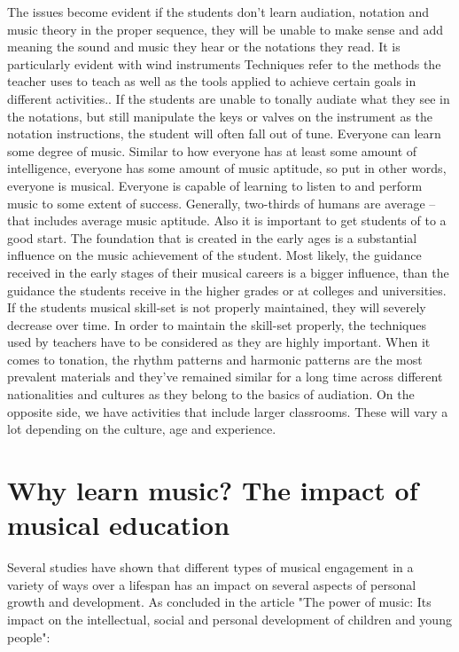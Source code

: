 The issues become evident if the students don’t learn audiation, notation and music theory in the proper sequence, they will be unable to make sense and add meaning the sound and music they hear or the notations they read. It is particularly evident with wind instruments Techniques refer to the methods the teacher uses to teach as well as the tools applied to achieve certain goals in different activities.. If the students are unable to tonally audiate what they see in the notations, but still manipulate the keys or valves on the instrument as the notation instructions, the student will often fall out of tune.
Everyone can learn some degree of music. Similar to how everyone has at least some amount of intelligence, everyone has some amount of music aptitude, so put in other words, everyone is musical. Everyone is capable of learning to listen to and perform music to some extent of success. Generally, two-thirds of humans are average – that includes average music aptitude.
Also it is important to get students of to a good start. The foundation that is created in the early ages is a substantial influence on the music achievement of the student. Most likely, the guidance received in the early stages of their musical careers is a bigger influence, than the guidance the students receive in the higher grades or at colleges and universities. If the students musical skill-set is not properly maintained, they will severely decrease over time.
In order to maintain the skill-set properly, the techniques used by teachers have to be considered as
they are highly important. When it comes to tonation, the rhythm patterns and harmonic patterns are the most prevalent materials and they’ve remained similar for a long time across different nationalities and cultures as they belong to the basics of audiation. On the opposite side, we have activities that include larger classrooms. These will vary a lot depending on the culture, age and experience.\\


\section{Why learn music? The impact of musical education}
Several studies have shown that different types of musical engagement in a variety of ways over a lifespan has an impact on several aspects of personal growth and development. As concluded in the article "The power of music: Its impact on the intellectual, social and personal development of children and young people":\\

